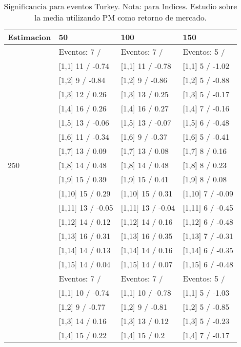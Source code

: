 \begin{table}

\caption{Significancia para eventos Turkey. Nota: para Indices. Estudio sobre la media utilizando PM como retorno de mercado.}
\centering
\begin{tabular}[t]{llll}
\toprule
Estimacion & 50 & 100 & 150\\
\midrule
 & Eventos:  7 / & Eventos:  7 / & Eventos:  5 /\\
 & {}[1,1] 11  / -0.74 & {}[1,1] 11  / -0.78 & {}[1,1] 5  / -1.02\\
 & {}[1,2] 9  / -0.84 & {}[1,2] 9  / -0.86 & {}[1,2] 5  / -0.88\\
 & {}[1,3] 12  / 0.26 & {}[1,3] 13  / 0.25 & {}[1,3] 5  / -0.17\\
 & {}[1,4] 16  / 0.26 & {}[1,4] 16  / 0.27 & {}[1,4] 7  / -0.16\\
\addlinespace
 & {}[1,5] 13  / -0.06 & {}[1,5] 13  / -0.07 & {}[1,5] 6  / -0.48\\
 & {}[1,6] 11  / -0.34 & {}[1,6] 9  / -0.37 & {}[1,6] 5  / -0.41\\
 & {}[1,7] 13  / 0.09 & {}[1,7] 13  / 0.08 & {}[1,7] 8  / 0.16\\
250 & {}[1,8] 14  / 0.48 & {}[1,8] 14  / 0.48 & {}[1,8] 8  / 0.23\\
 & {}[1,9] 15  / 0.39 & {}[1,9] 15  / 0.41 & {}[1,9] 8  / 0.08\\
\addlinespace
 & {}[1,10] 15  / 0.29 & {}[1,10] 15  / 0.31 & {}[1,10] 7  / -0.09\\
 & {}[1,11] 13  / -0.05 & {}[1,11] 13  / -0.04 & {}[1,11] 6  / -0.45\\
 & {}[1,12] 14  / 0.12 & {}[1,12] 14  / 0.16 & {}[1,12] 6  / -0.48\\
 & {}[1,13] 16  / 0.31 & {}[1,13] 16  / 0.35 & {}[1,13] 7  / -0.31\\
 & {}[1,14] 14  / 0.13 & {}[1,14] 14  / 0.16 & {}[1,14] 6  / -0.35\\
\addlinespace
 & {}[1,15] 14  / 0.04 & {}[1,15] 14  / 0.07 & {}[1,15] 6  / -0.48\\
 & Eventos:  7 / & Eventos:  7 / & Eventos:  5 /\\
 & {}[1,1] 10  / -0.74 & {}[1,1] 10  / -0.78 & {}[1,1] 5  / -1.03\\
 & {}[1,2] 9  / -0.77 & {}[1,2] 9  / -0.81 & {}[1,2] 5  / -0.85\\
 & {}[1,3] 14  / 0.16 & {}[1,3] 13  / 0.12 & {}[1,3] 5  / -0.23\\
\addlinespace
 & {}[1,4] 15  / 0.22 & {}[1,4] 15  / 0.2 & {}[1,4] 7  / -0.17\\

\end{tabular}
\end{table}
